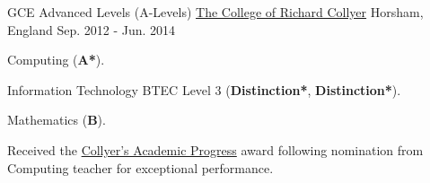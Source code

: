 \begin{cventries}
  \cventry
    {GCE Advanced Levels (A-Levels)}
    {\href{https://www.collyers.ac.uk/}{The College of Richard Collyer}}
    {Horsham, England}
    {Sep. 2012 - Jun. 2014}
    {
      \begin{cvitems}
        \item {Computing (\textbf{A*}).}
        \item {Information Technology BTEC Level 3 (\textbf{Distinction*}, \textbf{Distinction*}).}
        \item {Mathematics (\textbf{B}).}
        \item {Received the \href{https://www.westsussextoday.co.uk/news/outstanding-students-recognised-at-collyer-s-1-6481659}{Collyer's Academic Progress} award following nomination from Computing teacher for exceptional performance.}
      \end{cvitems}
    }
    {}
\end{cventries}
